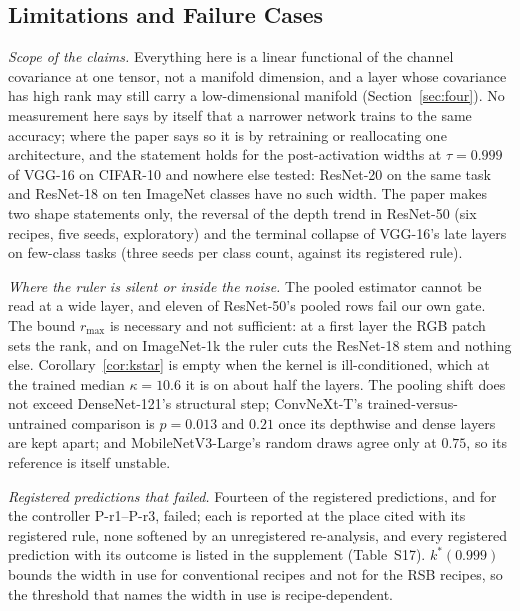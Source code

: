 \documentclass[10pt,journal,compsoc]{IEEEtran}
\begin{document}
\subsection{Limitations and Failure Cases}
\label{sec:limits}

\emph{Scope of the claims.} Everything here is a linear functional of the
channel covariance at one tensor, not a manifold dimension, and a layer
whose covariance has high rank may still carry a low-dimensional manifold
(Section~\ref{sec:four}). No measurement here says by itself that a
narrower network trains to the same accuracy; where the paper says so it
is by retraining or reallocating one architecture, and the statement
holds for the post-activation widths at $\tau = 0.999$ of VGG-16 on
CIFAR-10 and nowhere else tested: ResNet-20 on the same task and
ResNet-18 on ten ImageNet classes have no such width. The paper makes two
shape statements only, the reversal of the depth trend in ResNet-50 (six
recipes, five seeds, exploratory) and the terminal collapse of VGG-16's
late layers on few-class tasks (three seeds per class count, against its
registered rule).

\emph{Where the ruler is silent or inside the noise.} The pooled
estimator cannot be read at a wide layer, and eleven of ResNet-50's
pooled rows fail our own gate. The bound $r_{\max}$ is necessary and not
sufficient: at a first layer the RGB patch sets the rank, and on
ImageNet-1k the ruler cuts the ResNet-18 stem and nothing else.
Corollary~\ref{cor:kstar} is empty when the kernel is ill-conditioned,
which at the trained median $\kappa = 10.6$ it is on about half the
layers. The pooling shift does not exceed DenseNet-121's structural step;
ConvNeXt-T's trained-versus-untrained comparison is $p = 0.013$ and
$0.21$ once its depthwise and dense layers are kept apart; and
MobileNetV3-Large's random draws agree only at $0.75$, so its reference
is itself unstable.

\emph{Registered predictions that failed.} Fourteen of the registered
predictions, and for the controller P-r1--P-r3, failed; each is reported
at the place cited with its registered rule, none softened by an
unregistered re-analysis, and every registered prediction with its
outcome is listed in the supplement (Table~S17). $k^*(0.999)$ bounds the
width in use for conventional recipes and not for the RSB recipes, so the
threshold that names the width in use is recipe-dependent.
\end{document}
